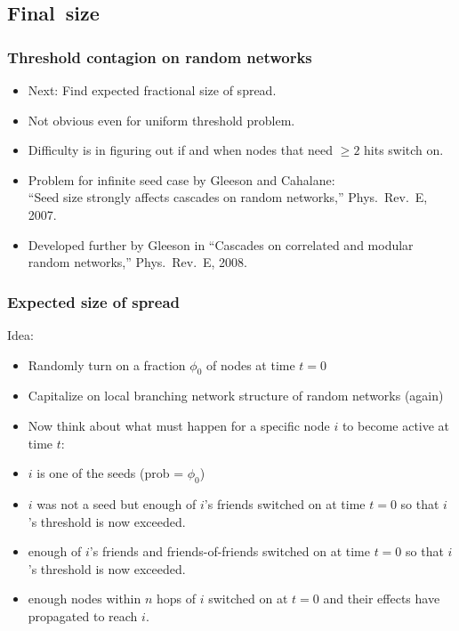 \subsection{Final\ size}

\begin{frame}
  \frametitle{Threshold contagion on random networks}

  \begin{block}{}
  \begin{itemize}
  \item<1->
    \alert{Next:} Find expected fractional size of spread.
  \item<2->
    Not obvious even for uniform threshold problem.
  \item<3->
    Difficulty is in figuring out if and when
    nodes that need $\ge 2$ hits switch on.
  \item<4->
    Problem  for infinite seed case by Gleeson and Cahalane:\\
    ``Seed size strongly affects cascades on random networks,'' 
    Phys.\ Rev.\ E, 2007.\cite{gleeson2007a}
  \item<5->
    Developed further by Gleeson
    in ``Cascades on correlated and modular random networks,'' 
    Phys.\ Rev.\ E, 2008.\cite{gleeson2008a}
  \end{itemize}
  \end{block}

\end{frame}

\begin{frame}
  \frametitle{Expected size of spread}

  \begin{block}{Idea:}
    \begin{itemize}
    \item<1-> 
      Randomly turn on a fraction $\phi_0$ of nodes at time $t=0$
    \item<2-> 
      Capitalize on local branching network structure of random
      networks (again)
    \item<3-> 
      Now think about what must happen for
      a specific node $i$ to become active at time $t$:
    \item<4->[$\bullet$]
       $i$ is one of the seeds (prob = $\phi_0$)
    \item<5->[$\bullet$]
       $i$ was not a seed but enough of $i$'s friends switched
      on at time $t=0$ so that $i$'s threshold is now exceeded.
    \item<6->[$\bullet$] 
       enough of $i$'s friends and friends-of-friends switched
      on at time $t=0$ so that $i$'s threshold is now exceeded.
    \item<7->[$\bullet$] 
       enough nodes within $n$ hops of $i$ 
      switched on at $t=0$ and their effects have propagated to reach $i$.
    \end{itemize}
  \end{block}

\end{frame}


